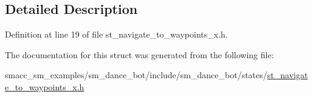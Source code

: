 \subsection{Detailed Description}


Definition at line 19 of file st\+\_\+navigate\+\_\+to\+\_\+waypoints\+\_\+x.\+h.



The documentation for this struct was generated from the following file\+:\begin{DoxyCompactItemize}
\item 
smacc\+\_\+sm\+\_\+examples/sm\+\_\+dance\+\_\+bot/include/sm\+\_\+dance\+\_\+bot/states/\hyperlink{st__navigate__to__waypoints__x_8h}{st\+\_\+navigate\+\_\+to\+\_\+waypoints\+\_\+x.\+h}\end{DoxyCompactItemize}
